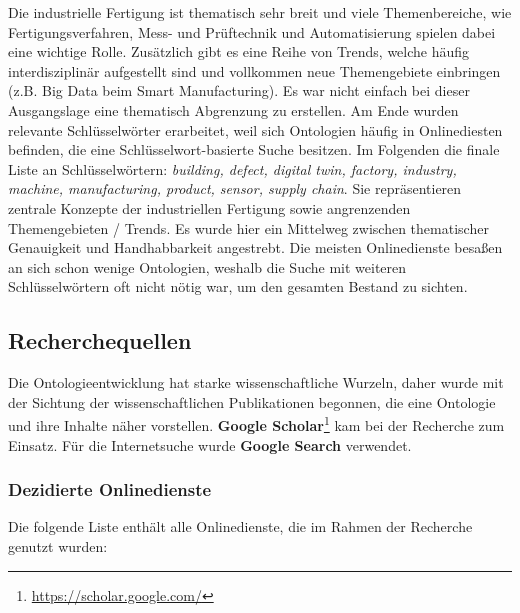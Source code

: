 \documentclass{article}
\begin{document}
Die industrielle Fertigung ist thematisch sehr breit und viele Themenbereiche, wie Fertigungsverfahren, Mess- und Prüftechnik und Automatisierung spielen dabei eine wichtige Rolle.
Zusätzlich gibt es eine Reihe von Trends, welche häufig interdisziplinär aufgestellt sind und vollkommen neue Themengebiete einbringen (z.B. Big Data beim Smart Manufacturing).
Es war nicht einfach bei dieser Ausgangslage eine thematisch Abgrenzung zu erstellen.
Am Ende wurden relevante Schlüsselwörter erarbeitet, weil sich Ontologien häufig in Onlinediesten befinden, die eine Schlüsselwort-basierte Suche besitzen. Im Folgenden die finale Liste an Schlüsselwörtern: \textit{building, defect, digital twin, factory, industry, machine, manufacturing, product, sensor, supply chain}.
Sie repräsentieren zentrale Konzepte der industriellen Fertigung sowie angrenzenden Themengebieten / Trends.
Es wurde hier ein Mittelweg zwischen thematischer Genauigkeit und Handhabbarkeit angestrebt.
Die meisten Onlinedienste besaßen an sich schon wenige Ontologien, weshalb die Suche mit weiteren Schlüsselwörtern oft nicht nötig war, um den gesamten Bestand zu sichten.

\subsection{Recherchequellen}

Die Ontologieentwicklung hat starke wissenschaftliche Wurzeln, daher wurde mit der Sichtung der wissenschaftlichen Publikationen begonnen, die eine Ontologie und ihre Inhalte näher vorstellen.
\textbf{Google Scholar}\footnote{\url{https://scholar.google.com/}} kam bei der Recherche zum Einsatz.
Für die Internetsuche wurde \textbf{Google Search} verwendet.

\subsubsection{Dezidierte Onlinedienste}

Die folgende Liste enthält alle Onlinedienste, die im Rahmen der Recherche genutzt wurden:
\end{document}
